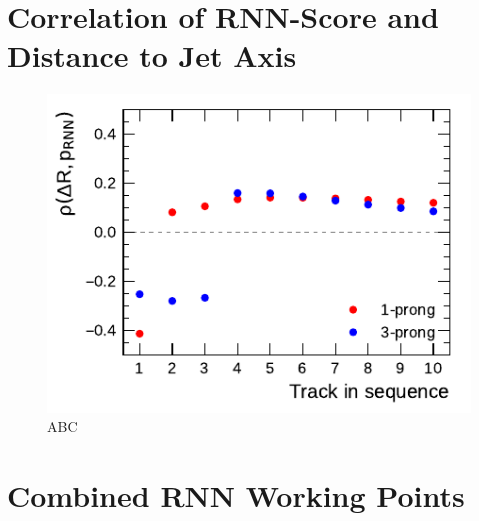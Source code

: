 
\clearpage
\section{Correlation of RNN-Score and Distance to Jet Axis}
\label{app:corr_dr}

\begin{figure}[htb]
  \centering
  \includegraphics{./figures/rnn/track/dR_corr.pdf}
  \caption{ABC}
\end{figure}

\clearpage
\section{Combined RNN Working Points}
\label{app:rnn_wp}

